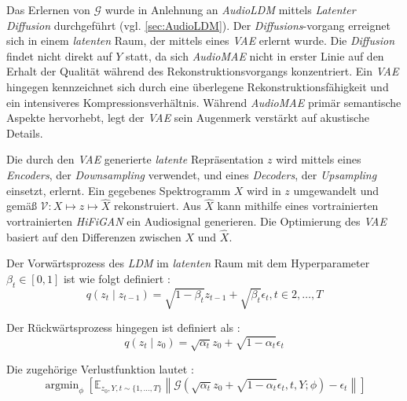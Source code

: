 \documentclass[
  a4paper,  %
  twoside,  %
  bibliography=totoc,
  headsepline,
  cleardoublepage=empty,
  parskip=half,
  draft=false
]{scrbook}
\begin{document}
Das Erlernen von $\mathcal{G}$ wurde in Anlehnung an \emph{AudioLDM} \cite{liu_audioldm_2023} mittels \emph{Latenter Diffusion} \cite{rombach_high-resolution_2022} durchgeführt (vgl. \ref{sec:AudioLDM}). Der \emph{Diffusions}-vorgang erreignet sich in einem \emph{latenten} Raum, der mittels eines \emph{VAE} \cite{kingma_auto-encoding_2022} erlernt wurde. Die \emph{Diffusion} findet nicht direkt auf $Y$ statt, da sich \emph{AudioMAE} nicht in erster Linie auf den Erhalt der Qualität während des Rekonstruktionsvorgangs konzentriert. Ein \emph{VAE} hingegen kennzeichnet sich durch eine überlegene Rekonstruktionsfähigkeit und ein intensiveres Kompressionsverhältnis. Während \emph{AudioMAE} primär semantische Aspekte hervorhebt, legt der \emph{VAE} sein Augenmerk verstärkt auf akustische Details. \cite{liu_audioldm2_2023}

Die durch den \emph{VAE} generierte \emph{latente} Repräsentation $z$ wird mittels eines \emph{Encoders}, der \emph{Downsampling} verwendet, und eines \emph{Decoders}, der \emph{Upsampling} einsetzt, erlernt. Ein gegebenes Spektrogramm $X$ wird in $z$ umgewandelt und gemäß $\mathcal{V}: X \mapsto z \mapsto \hat{X}$ rekonstruiert. Aus $\hat{X}$ kann mithilfe eines vortrainierten vortrainierten \emph{HiFiGAN} \cite{kong_hifi-gan_2020} ein Audiosignal generieren. Die Optimierung des \emph{VAE} basiert auf den Differenzen zwischen $X$ und $\hat{X}$. \cite{liu_audioldm2_2023}

Der Vorwärtsprozess des \emph{LDM} im \emph{latenten} Raum mit dem Hyperparameter $\beta_t \in[0,1]$ ist wie folgt definiert \cite{liu_audioldm2_2023}:
\begin{equation}
    q\left(z_t \mid z_{t-1}\right)=\sqrt{1-\beta_t} z_{t-1}+\sqrt{\beta_t} \epsilon_t, t \in 2, \ldots, T
\end{equation}

Der Rückwärtsprozess hingegen ist definiert als \cite{liu_audioldm2_2023}:
\begin{equation}
q\left(z_t \mid z_0\right)=\sqrt{\alpha_t} z_0+\sqrt{1-\alpha_t} \epsilon_t
\end{equation}

Die zugehörige Verlustfunktion lautet \cite{liu_audioldm2_2023}:
\begin{equation}
\operatorname{argmin}_\phi\left[\mathbb{E}_{z_0, Y, t \sim\{1, \ldots, T\}}\left\|\mathcal{G}\left(\sqrt{\alpha_t} z_0+\sqrt{1-\alpha_t} \epsilon_t, t, Y ; \phi\right)-\epsilon_t\right\|\right]
\end{equation}
\end{document}
